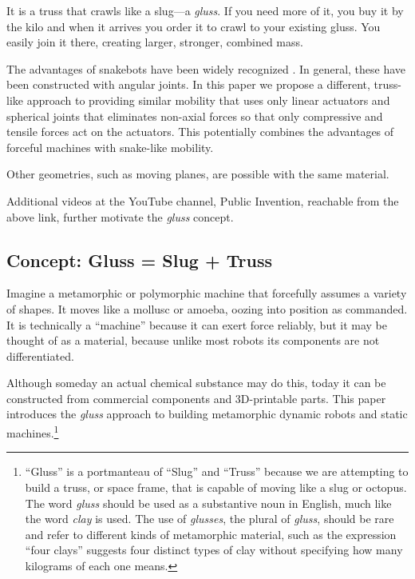 \documentclass[11pt]{article}
\begin{document}
It is a truss that crawls like a slug---a \emph{gluss}.
If you need more of it, you buy it by the kilo and when it arrives you order it
to crawl to your existing gluss. You easily join it there, creating 
larger, stronger, combined mass.

The advantages of snakebots have been widely recognized \cite{liljebäck2012snake}.
In general, these have been constructed
with angular joints. In this paper we propose a different, truss-like approach to providing similar
mobility that uses only linear actuators and spherical joints that eliminates non-axial forces so that only
compressive and tensile forces act on the actuators.
This potentially combines the advantages of forceful machines with snake-like mobility.


Other geometries, such as moving planes, are possible with the same material.

Additional videos at the YouTube channel, Public Invention, reachable from the above link,
further motivate the \emph{gluss} concept.


\subsection{Concept: Gluss = Slug + Truss}

Imagine a metamorphic or polymorphic machine that forcefully assumes a variety of shapes. It moves like a mollusc or amoeba,
oozing into position as commanded. It is technically a ``machine'' because it can exert force reliably, but
it may be thought of as a material, because unlike most robots its components are not differentiated.

Although someday an actual chemical substance may do this, today it can be constructed from commercial components
and 3D-printable parts. This paper introduces the \emph{gluss} approach to building metamorphic dynamic robots
and static machines.\footnote{ ``Gluss'' is a portmanteau of ``Slug'' and ``Truss'' because we are attempting to
build a truss, or space frame, that is capable of moving like a slug or octopus.
The word \textit{gluss}
should be used as a substantive noun in English, much like the word \textit{clay} is used.
The use of \textit{glusses}, the plural
of \textit{gluss}, should be rare and refer to different kinds of metamorphic material, such as the expression
``four clays'' suggests four distinct types of clay without specifying how many kilograms of each one means.}
\end{document}
